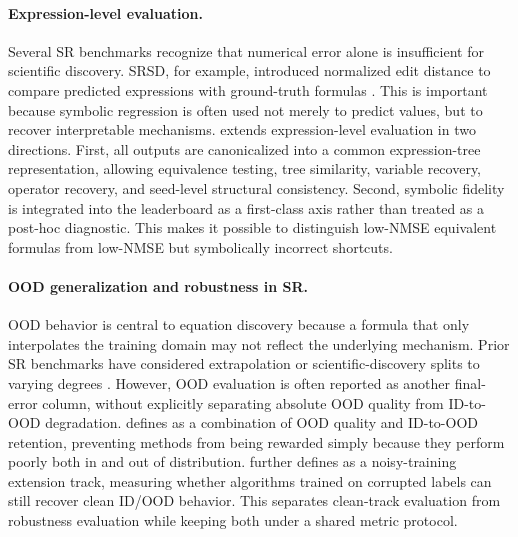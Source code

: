 \paragraph{Expression-level evaluation.}
Several SR benchmarks recognize that numerical error alone is insufficient for scientific discovery. SRSD, for example, introduced normalized edit distance to compare predicted expressions with ground-truth formulas \citep{matsubara2024rethinking}. This is important because symbolic regression is often used not merely to predict values, but to recover interpretable mechanisms. \arena{} extends expression-level evaluation in two directions. First, all outputs are canonicalized into a common expression-tree representation, allowing equivalence testing, tree similarity, variable recovery, operator recovery, and seed-level structural consistency. Second, symbolic fidelity is integrated into the leaderboard as a first-class axis rather than treated as a post-hoc diagnostic. This makes it possible to distinguish low-NMSE equivalent formulas from low-NMSE but symbolically incorrect shortcuts.

\paragraph{OOD generalization and robustness in SR.}
OOD behavior is central to equation discovery because a formula that only interpolates the training domain may not reflect the underlying mechanism. Prior SR benchmarks have considered extrapolation or scientific-discovery splits to varying degrees \citep{lacava2021contemporary,matsubara2024rethinking,shojaee2025llmsrbench}. However, OOD evaluation is often reported as another final-error column, without explicitly separating absolute OOD quality from ID-to-OOD degradation. \arena{} defines \oodg{} as a combination of OOD quality and ID-to-OOD retention, preventing methods from being rewarded simply because they perform poorly both in and out of distribution. \arena{} further defines \rob{} as a noisy-training extension track, measuring whether algorithms trained on corrupted labels can still recover clean ID/OOD behavior. This separates clean-track evaluation from robustness evaluation while keeping both under a shared metric protocol.

